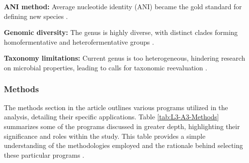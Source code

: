 \textbf{ANI method:} Average nucleotide identity (ANI) became the gold standard for defining new species \cite*{L3-TaxNotes}.

\textbf{Genomic diversity:} The genus is highly diverse, with distinct clades forming homofermentative and heterofermentative groups \cite*{L3-TaxNotes}.

\textbf{Taxonomy limitations:} Current genus is too heterogeneous, hindering research on microbial properties, leading to calls for taxonomic reevaluation \cite*{L3-TaxNotes}.

\subsubsection{Methods}
The methods section in the article outlines various programs utilized in the analysis, detailing their specific applications. Table \ref*{tab:L3-A3-Methods} summarizes some of the programs discussed in greater depth, highlighting their significance and roles within the study. This table provides a simple understanding of the methodologies employed and the rationale behind selecting these particular programs \cite*{L3-TaxNotes}.
